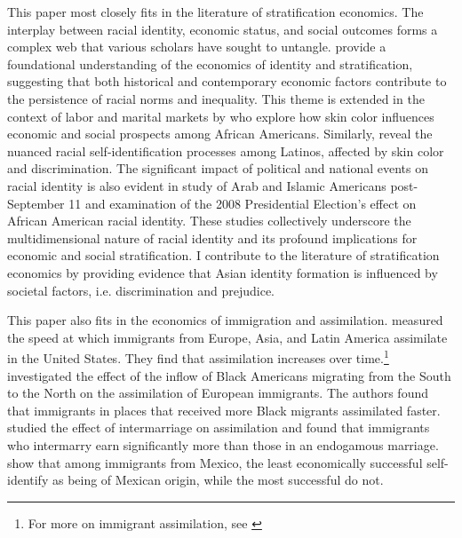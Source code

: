This paper most closely fits in the literature of stratification economics. The interplay between racial identity, economic status, and social outcomes forms a complex web that various scholars have sought to untangle. \textcite{darityEconomicsIdentityOrigin2006,darityPositionPossessionsStratification2022} provide a foundational understanding of the economics of identity and stratification, suggesting that both historical and contemporary economic factors contribute to the persistence of racial norms and inequality. This theme is extended in the context of labor and marital markets by \textcite{goldsmithDarkLightSkin2007,hamiltonSheddingLightMarriage2009,dietteSkinShadeStratification2015} who explore how skin color influences economic and social prospects among African Americans. Similarly, \textcite{golash-bozaLatinoRacialChoices2008} reveal the nuanced racial self-identification processes among Latinos, affected by skin color and discrimination. The significant impact of political and national events on racial identity is also evident in \textcite{masonStigmatizationRacialSelection2014} study of Arab and Islamic Americans post-September 11 and \textcite{masonNotBlackAlone20082017} examination of the 2008 Presidential Election's effect on African American racial identity. These studies collectively underscore the multidimensional nature of racial identity and its profound implications for economic and social stratification. I contribute to the literature of stratification economics by providing evidence that Asian identity formation is influenced by societal factors, i.e. discrimination and prejudice. 

This paper also fits in the economics of immigration and assimilation. \textcite{abramitzkyCulturalAssimilationAge2016} measured the speed at which immigrants from Europe, Asia, and Latin America assimilate in the United States. They find that assimilation increases over time.\footnote{For more on immigrant assimilation, see \textcite{abramitzkyLeavingEnclaveHistorical2020,abramitzkyIntergenerationalMobilityImmigrants2019,abramitzkyDiscriminationReturnsCultural2020,abramitzkyNationImmigrantsAssimilation2014}} \textcite{foukaImmigrantsAmericansRace2022} investigated the effect of the inflow of Black Americans migrating from the South to the North on the assimilation of European immigrants. The authors found that immigrants in places that received more Black migrants assimilated faster.  \textcite{mengIntermarriageEconomicAssimilation2005} studied the effect of intermarriage on assimilation and found that immigrants who intermarry earn significantly more than those in an endogamous marriage. \textcite{antmanEthnicAttritionObserved2016} show that among immigrants from Mexico, the least economically successful self-identify as being of Mexican origin, while the most successful do not.

